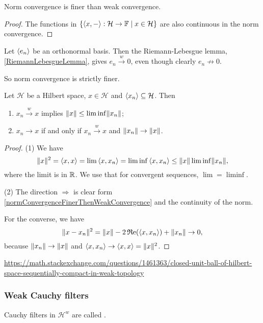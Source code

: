 \begin{lemma} \label{normConvergenceFinerThenWeakConvergence}
Norm convergence is finer than weak convergence.
\end{lemma}
\begin{proof}
The functions in $\left\{ \left\langle x,- \right\rangle: \mathcal{H}\to \mathbb{F} \;\middle|\; x\in\mathcal{H} \right\}$ are also continuous in the norm convergence.
\end{proof}

\begin{example}
Let $\left\langle e_n \right\rangle$ be an orthonormal basis. Then the Riemann-Lebesgue lemma, \ref{RiemannLebesgueLemma}, gives $e_n \overset{w}{\longrightarrow} 0$, even though clearly $e_n \not\to 0$.
\end{example}

So norm convergence is strictly finer.

\begin{proposition}
Let $\mathcal{H}$ be a Hilbert space, $x\in \mathcal{H}$ and $\left\langle x_n \right\rangle\subseteq \mathcal{H}$. Then
\begin{enumerate}
\item $x_n \overset{w}{\longrightarrow} x$ implies $\lVert x\rVert \leq \liminf \lVert x_n\rVert$;
\item $x_n \longrightarrow x$ \textup{if and only if} $x_n \overset{w}{\longrightarrow} x$ and $\lVert x_n\rVert\to \lVert x\rVert$.
\end{enumerate}
\end{proposition}
\begin{proof}
(1) We have
\[ \lVert x\rVert^2 = \left\langle x,x \right\rangle = \lim \left\langle x,x_n \right\rangle = \liminf\left\langle x,x_n \right\rangle \leq \lVert x\rVert\liminf\lVert x_n\rVert, \]
where the limit is in $\mathbb{R}$. We use that for convergent sequences, $\lim = \liminf$.

(2) The direction $\Rightarrow$ is clear form \ref{normConvergenceFinerThenWeakConvergence} and the continuity of the norm.

For the converse, we have
\[ \lVert x-x_n\rVert^2 = \lVert x\rVert-2\operatorname{\mathfrak{R}e}(\left\langle x,x_n \right\rangle) + \lVert x_n\rVert \to 0, \]
because $\lVert x_n\rVert \to \lVert x\rVert$ and $\left\langle x,x_n \right\rangle \to \left\langle x,x \right\rangle = \lVert x\rVert^2$.
\end{proof}

\url{https://math.stackexchange.com/questions/1461363/closed-unit-ball-of-hilbert-space-sequentially-compact-in-weak-topology}

\subsubsection{Weak Cauchy filters}
\begin{definition}
Cauchy filters in $\mathcal{H}^w$ are called .
\end{definition}


